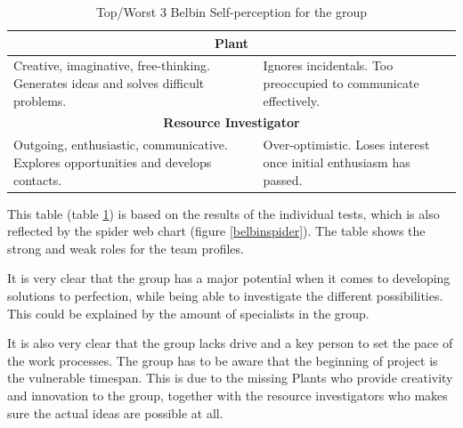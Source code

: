 \begin{table}[h]
\begin{tabular}{|p{}|p{}|}
\multicolumn{2}{|c|}{\textbf{Plant}}                                                                                                                                         \\ \hline
Creative, imaginative, free-thinking. Generates ideas and solves difficult problems.        & Ignores incidentals. Too preoccupied to communicate effectively.             \\ \hline
\multicolumn{2}{|c|}{\textbf{Resource Investigator}}                                                                                                                         \\ \hline
Outgoing, enthusiastic, communicative. Explores opportunities and develops contacts.        & Over-optimistic. Loses interest once initial enthusiasm has passed.          \\ \hline
\end{tabular}
\caption{Top/Worst 3 Belbin Self-perception for the group}
\label{belbintable}
\end{table}

This table (table \ref{belbintable}) is based on the results of the individual tests, which is also reflected by the spider web chart (figure \ref{belbinspider}). The table shows the strong and weak roles for the team profiles.

It is very clear that the group has a major potential when it comes to developing solutions to perfection, while being able to investigate the different possibilities. This could be explained by the amount of specialists in the group.

It is also very clear that the group lacks drive and a key person to set the pace of the work processes. The group has to be aware that the beginning of project is the vulnerable timespan. This is due to the missing Plants who provide creativity and innovation to the group, together with the resource investigators who makes sure the actual ideas are possible at all.
 


